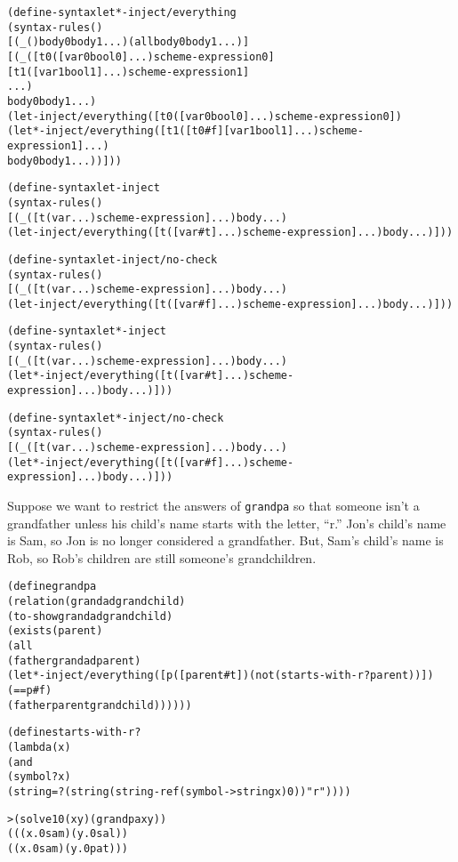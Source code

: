 \begin{alltt}
(define-syntax let*-inject/everything
  (syntax-rules ()
    [(_ () body0 body1 ...) (all body0 body1 ...)]
    [(_ ([t0 ([var0 bool0] ...) scheme-expression0]
         [t1 ([var1 bool1] ...) scheme-expression1]
         ...)
       body0 body1 ...)
     (let-inject/everything ([t0 ([var0 bool0] ...) scheme-expression0])
       (let*-inject/everything ([t1 ([t0 #f][var1 bool1] ...) scheme-expression1] ...)
         body0 body1 ...))]))

(define-syntax let-inject
  (syntax-rules ()
    [(_ ([t (var ...) scheme-expression] ...) body ...)
     (let-inject/everything ([t ([var #t] ...) scheme-expression] ...) body ...)]))

(define-syntax let-inject/no-check
  (syntax-rules ()
    [(_ ([t (var ...) scheme-expression] ...) body ...)
     (let-inject/everything ([t ([var #f] ...) scheme-expression] ...) body ...)]))

(define-syntax let*-inject
  (syntax-rules ()
    [(_ ([t (var ...) scheme-expression] ...) body ...)
     (let*-inject/everything ([t ([var #t] ...) scheme-expression] ...) body ...)]))

(define-syntax let*-inject/no-check
  (syntax-rules ()
    [(_ ([t (var ...) scheme-expression] ...) body ...)
     (let*-inject/everything ([t ([var #f] ...) scheme-expression] ...) body ...)]))
\end{alltt}

Suppose we want to restrict the answers of \texttt{grandpa} so that
someone isn't a grandfather unless his child's name starts with the
letter, ``r.''  Jon's child's name is Sam, so Jon is no
longer considered a grandfather. But, Sam's child's name is
Rob, so Rob's children are still someone's grandchildren.

\begin{alltt}
(define grandpa
  (relation (grandad grandchild)
    (to-show grandad grandchild)
    (exists (parent)
      (all
        (father grandad parent)
        (let*-inject/everything ([p ([parent #t]) (not (starts-with-r? parent))])
          (== p #f)
          (father parent grandchild))))))

(define starts-with-r?
  (lambda (x)
    (and
      (symbol? x)
      (string=? (string (string-ref (symbol->string x) 0)) "r"))))
\end{alltt}

\begin{alltt}
> (solve 10 (x y) (grandpa x y))
(((x.0 sam) (y.0 sal))
 ((x.0 sam) (y.0 pat)))
\end{alltt}

